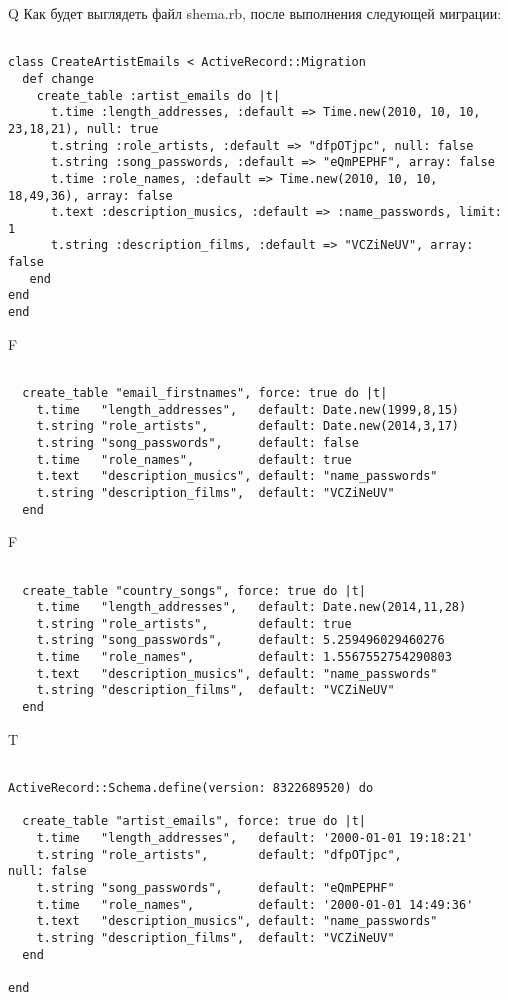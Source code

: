 
Q
Как будет выглядеть файл shema.rb, после выполнения следующей миграции:

\begin{verbatim}

class CreateArtistEmails < ActiveRecord::Migration 
  def change 
    create_table :artist_emails do |t| 
      t.time :length_addresses, :default => Time.new(2010, 10, 10, 23,18,21), null: true
      t.string :role_artists, :default => "dfpOTjpc", null: false
      t.string :song_passwords, :default => "eQmPEPHF", array: false
      t.time :role_names, :default => Time.new(2010, 10, 10, 18,49,36), array: false
      t.text :description_musics, :default => :name_passwords, limit: 1
      t.string :description_films, :default => "VCZiNeUV", array: false
   end
end
end
\end{verbatim}

F
\begin{verbatim}

  create_table "email_firstnames", force: true do |t|
    t.time   "length_addresses",   default: Date.new(1999,8,15)
    t.string "role_artists",       default: Date.new(2014,3,17)
    t.string "song_passwords",     default: false
    t.time   "role_names",         default: true
    t.text   "description_musics", default: "name_passwords"
    t.string "description_films",  default: "VCZiNeUV"
  end

\end{verbatim}

F
\begin{verbatim}

  create_table "country_songs", force: true do |t|
    t.time   "length_addresses",   default: Date.new(2014,11,28)
    t.string "role_artists",       default: true
    t.string "song_passwords",     default: 5.259496029460276
    t.time   "role_names",         default: 1.5567552754290803
    t.text   "description_musics", default: "name_passwords"
    t.string "description_films",  default: "VCZiNeUV"
  end

\end{verbatim}

T
\begin{verbatim}

ActiveRecord::Schema.define(version: 8322689520) do

  create_table "artist_emails", force: true do |t|
    t.time   "length_addresses",   default: '2000-01-01 19:18:21'
    t.string "role_artists",       default: "dfpOTjpc",            null: false
    t.string "song_passwords",     default: "eQmPEPHF"
    t.time   "role_names",         default: '2000-01-01 14:49:36'
    t.text   "description_musics", default: "name_passwords"
    t.string "description_films",  default: "VCZiNeUV"
  end

end
\end{verbatim}


